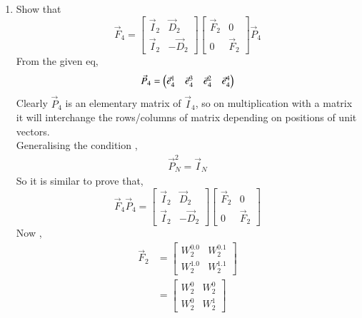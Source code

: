 \documentclass[journal,12pt,twocolumn]{IEEEtran}
\renewcommand\thesection{\arabic{section}}
\begin{document}
\begin{enumerate}[label=\thesection.\arabic*]
\begin{enumerate}[label=\arabic*.,ref=\thesection.\theenumi]
     \item Show that 
     \begin{equation}
       \vec{F}_{4}=
       \begin{bmatrix}
         \vec{I}_{2} & \vec{D}_{2} \\
         \vec{I}_{2} & -\vec{D}_{2}
       \end{bmatrix}
       \begin{bmatrix}
         \vec{F}_{2} & 0 \\
         0 & \vec{F}_{2}
       \end{bmatrix}
       \vec{P}_{4}
     \end{equation}
     \solution From the given eq,
     \begin{align}
       \vec{P}_4 = \begin{pmatrix}\vec{e}_4^{1} &\vec{e}_4^{3} &\vec{e}_4^{2} &\vec{e}_4^{4} \end{pmatrix}
     \end{align}
     Clearly $\vec{P}_4$ is an elementary matrix of $\vec{I}_{4}$, so on multiplication with a matrix it will interchange the rows/columns of matrix depending on positions of unit vectors.\\
     Generalising the condition ,
     \begin{align}
       \vec{P}_{N}^2 = \vec{I}_{N} \label{fft-4}
     \end{align}
     So it is similar to prove that, 
     \begin{equation} 
       \vec{F}_{4}\vec{P}_{4}=
       \begin{bmatrix}
         \vec{I}_{2} & \vec{D}_{2} \\
         \vec{I}_{2} & -\vec{D}_{2}
       \end{bmatrix}
       \begin{bmatrix}
         \vec{F}_{2} & 0 \\
         0 & \vec{F}_{2}   
       \end{bmatrix}                    
     \end{equation}
     Now ,
     \begin{align}
       \vec{F}_{2} &= 
       \begin{bmatrix}
         W_2^{0.0} & W_2^{0.1} \\
         W_2^{1.0} & W_2^{1.1}
       \end{bmatrix} \\
       &= \begin{bmatrix}
         W_2^{0} & W_2^{0} \\
         W_2^{0} & W_2^{1}
       \end{bmatrix}

\end{align}
\end{enumerate}
\end{enumerate}
\end{document}
